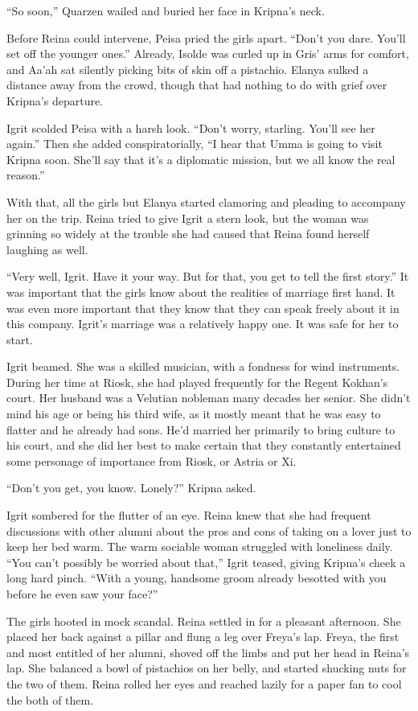 \documentclass{article}
\begin{document}
	“So soon,” Quarzen wailed and buried her face in Kripna’s neck. 
	
	Before Reina could intervene, Peisa pried the girls apart. “Don’t you dare. You’ll set off the younger ones.” Already, Isolde was curled up in Gris’ arms for comfort, and Aa’ah sat silently picking bits of skin off a pistachio. Elanya sulked a distance away from the crowd, though that had nothing to do with grief over Kripna’s departure. 
	
	Igrit scolded Peisa with a harsh look. “Don’t worry, starling. You’ll see her again.” Then she added conspiratorially, “I hear that Umma is going to visit Kripna soon. She’ll say that it’s a diplomatic mission, but we all know the real reason.” 
	
	With that, all the girls but Elanya started clamoring and pleading to accompany her on the trip. Reina tried to give Igrit a stern look, but the woman was grinning so widely at  the trouble she had caused that Reina found herself laughing as well.
	
	“Very well, Igrit. Have it your way. But for that, you get to tell the first story.” It was important that the girls know about the realities of marriage first hand. It was even more important that they know that they can speak freely about it in this company. Igrit’s marriage was a relatively happy one. It was safe for her to start.
	
	Igrit beamed. She was a skilled musician, with a fondness for wind instruments. During her time at Riosk, she had played frequently for the Regent Kokhan’s court. Her husband was a Velutian nobleman many decades her senior. She didn’t mind his age or being his third wife, as it mostly meant that he was easy to flatter and he already had sons. He’d married her primarily to bring culture to his court, and she did her best to make certain that they constantly entertained some personage of importance from Riosk, or Astria or Xi.
	
	“Don’t you get, you know. Lonely?” Kripna asked.
	
	Igrit sombered for the flutter of an eye. Reina knew that she had frequent discussions with other alumni about the pros and cons of taking on a lover just to keep her bed warm. The warm sociable woman struggled with loneliness daily. “You can’t possibly be worried about that,” Igrit teased, giving Kripna’s cheek a long hard pinch. “With a young, handsome groom already besotted with you before he even saw your face?” 
	
	The girls hooted in mock scandal. Reina settled in for a pleasant afternoon. She placed her back against a pillar and flung a leg over Freya’s lap. Freya, the first and most entitled of her alumni, shoved off the limbs and put her head in Reina’s lap. She balanced a bowl of pistachios on her belly, and started shucking nuts for the two of them. Reina rolled her eyes and reached lazily for a paper fan to cool the both of them.
	
\end{document}

